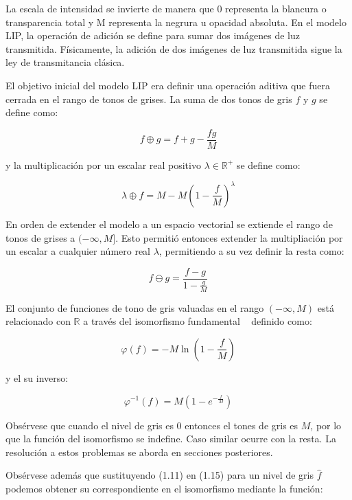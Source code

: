 La escala de intensidad se invierte de manera que 0 representa la blancura o transparencia total y M representa la negrura u opacidad absoluta. En el modelo LIP, la operación de adición se define para sumar dos imágenes de luz transmitida. Físicamente, la adición de dos imágenes de luz transmitida sigue la ley de transmitancia clásica. 

El objetivo inicial del modelo LIP era definir una operación aditiva que fuera cerrada en el rango de tonos de grises. La suma de dos tonos de gris $f$ y $g$ se define como:

\begin{equation}
	f\oplus g=f+g-\frac{fg}{M}
\end{equation}

y la multiplicación por un escalar real positivo $\lambda \in \mathbb{R}^+$ se define como:

\begin{equation}
	\lambda \oplus f = M - M\left(1-\frac{f}{M}\right)^\lambda
\end{equation}

En orden de extender el modelo a un espacio vectorial se extiende el rango de tonos de grises a $(-\infty,M]$. Esto permiti\'o entonces extender la multipliaci\'on por un escalar a cualquier n\'umero real $\lambda$, permitiendo a su vez definir la resta como:

\begin{equation}
	f \ominus g = \frac{f-g}{1-\frac{g}{M}}
\end{equation}

El conjunto de funciones de tono de gris valuadas en el rango $(-\infty, M)$ está relacionado con $\mathbb{R}$ a través del isomorfismo fundamental ~\cite{jourlin2016logarithmic} definido como:

\begin{equation}
	\varphi(f) = -M\ln\left(1-\frac{f}{M}\right)
\end{equation}

y el su inverso:

\begin{equation}
	\varphi^{-1} (f) = M\left(1-e^{-\frac{f}{M}}\right)
\end{equation}

Obs\'ervese que cuando el nivel de gris es 0 entonces el tones de gris es $M$, por lo que la funci\'on del isomorfismo se indefine. Caso similar ocurre con la resta. La resoluci\'on a estos problemas se aborda en secciones posteriores.

Obs\'ervese adem\'as que sustituyendo (1.11) en (1.15) para un nivel de gris $\hat{f}$ podemos obtener su correspondiente en el isomorfismo mediante la funci\'on:

